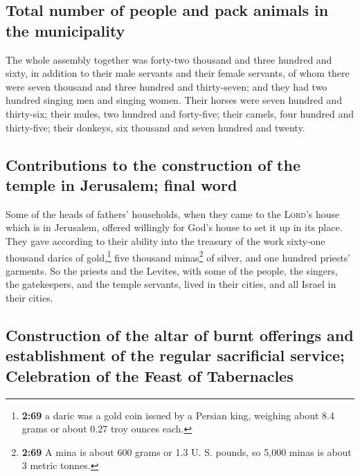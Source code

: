 \hypertarget{total-number-of-people-and-pack-animals-in-the-municipality}{%
\subsection{Total number of people and pack animals in the
municipality}\label{total-number-of-people-and-pack-animals-in-the-municipality}}

 The whole assembly together was forty-two thousand and
three hundred and sixty,  in addition to their male
servants and their female servants, of whom there were seven thousand
and three hundred and thirty-seven; and they had two hundred singing men
and singing women.  Their horses were seven hundred and
thirty-six; their mules, two hundred and forty-five; 
their camels, four hundred and thirty-five; their donkeys, six thousand
and seven hundred and twenty.

\hypertarget{contributions-to-the-construction-of-the-temple-in-jerusalem-final-word}{%
\subsection{Contributions to the construction of the temple in
Jerusalem; final
word}\label{contributions-to-the-construction-of-the-temple-in-jerusalem-final-word}}

 Some of the heads of fathers' households, when they came
to the \textsc{Lord}'s house which is in Jerusalem, offered willingly
for God's house to set it up in its place.  They gave
according to their ability into the treasury of the work sixty-one
thousand darics of gold,\footnote{\textbf{2:69} a daric was a gold coin
  issued by a Persian king, weighing about 8.4 grams or about 0.27 troy
  ounces each.} five thousand minas\footnote{\textbf{2:69} A mina is
  about 600 grams or 1.3 U. S. pounds, so 5,000 minas is about 3 metric
  tonnes.} of silver, and one hundred priests' garments. 
So the priests and the Levites, with some of the people, the singers,
the gatekeepers, and the temple servants, lived in their cities, and all
Israel in their cities.

\hypertarget{construction-of-the-altar-of-burnt-offerings-and-establishment-of-the-regular-sacrificial-service-celebration-of-the-feast-of-tabernacles}{%
\subsection{Construction of the altar of burnt offerings and
establishment of the regular sacrificial service; Celebration of the
Feast of
Tabernacles}\label{construction-of-the-altar-of-burnt-offerings-and-establishment-of-the-regular-sacrificial-service-celebration-of-the-feast-of-tabernacles}}

